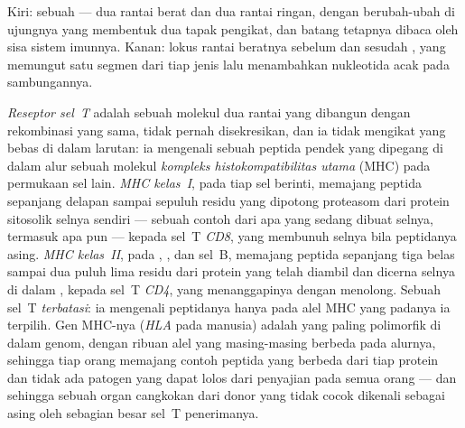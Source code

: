 \begin{omfigure}
{\small Kiri: sebuah  --- dua rantai berat dan dua rantai ringan,
dengan  berubah-ubah di ujungnya yang membentuk dua tapak pengikat, dan
batang tetapnya dibaca oleh sisa sistem imunnya. Kanan: lokus rantai
beratnya sebelum dan sesudah , yang memungut satu segmen dari
tiap jenis lalu menambahkan nukleotida acak pada sambungannya.}
\end{omfigure}

\begin{definition}\label{def:b3:adaptive-immunity:mhc}
%
\emph{Reseptor sel~T} adalah sebuah molekul dua rantai yang dibangun dengan
rekombinasi yang sama, tidak pernah disekresikan, dan ia tidak mengikat 
yang bebas di dalam larutan: ia mengenali sebuah peptida pendek yang dipegang di
dalam alur sebuah molekul \emph{kompleks histokompatibilitas utama} (MHC) pada
permukaan sel lain. \emph{MHC kelas~I}, pada tiap sel berinti, memajang
peptida sepanjang delapan sampai sepuluh residu yang dipotong proteasom dari
protein sitosolik selnya sendiri --- sebuah contoh dari apa yang sedang dibuat
selnya, termasuk  apa pun --- kepada sel~T \emph{CD8}, yang membunuh selnya
bila peptidanya asing. \emph{MHC kelas~II}, pada ,
, dan sel~B, memajang peptida sepanjang tiga belas sampai dua puluh lima
residu dari protein yang telah diambil dan dicerna selnya di dalam
, kepada sel~T \emph{CD4}, yang menanggapinya dengan menolong. Sebuah
sel~T \emph{terbatasi}: ia mengenali peptidanya hanya pada alel MHC yang
padanya ia terpilih. Gen MHC-nya (\emph{HLA} pada manusia) adalah yang paling
polimorfik di dalam genom, dengan ribuan alel yang masing-masing berbeda pada
alurnya, sehingga tiap orang memajang contoh peptida yang berbeda dari tiap
protein dan tidak ada patogen yang dapat lolos dari penyajian pada semua orang
--- dan sehingga sebuah organ cangkokan dari donor yang tidak cocok
dikenali sebagai asing oleh sebagian besar sel~T penerimanya.
\end{definition}

